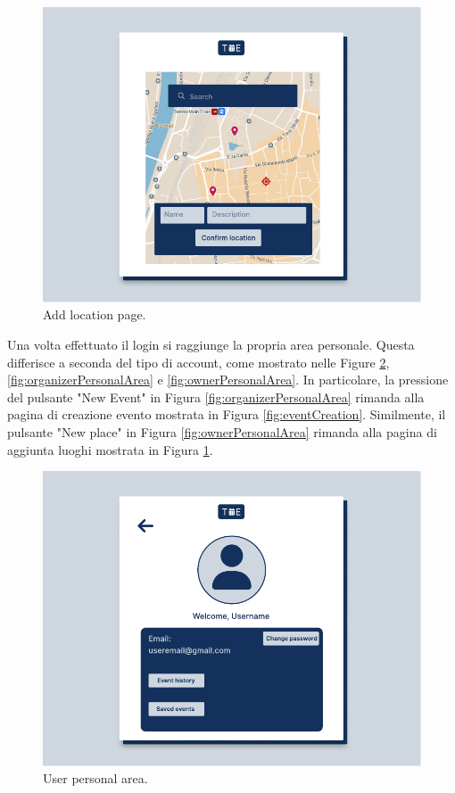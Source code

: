 \documentclass[9pt]{extarticle}
\begin{document}
\begin{figure}[!htb]
	\centering
	\includegraphics[width=.7\linewidth]{./images/AddLocation.pdf}
	\caption{Add location page.}
	\label{fig:addLocation}
\end{figure}


Una volta effettuato il login si raggiunge la propria area personale. Questa differisce a seconda del tipo di account, come mostrato nelle Figure \ref{fig:userPersonalArea}, \ref{fig:organizerPersonalArea} e \ref{fig:ownerPersonalArea}. In particolare, la pressione del pulsante "New Event" in Figura \ref{fig:organizerPersonalArea} rimanda alla pagina di creazione evento mostrata in Figura \ref{fig:eventCreation}. Similmente, il pulsante "New place" in Figura \ref{fig:ownerPersonalArea} rimanda alla pagina di aggiunta luoghi mostrata in Figura \ref{fig:addLocation}.


\begin{figure}[!htb]
	\centering
	\includegraphics[width=.7\linewidth]{./images/UserPersonalArea.pdf}
	\caption{User personal area.}
	\label{fig:userPersonalArea}
\end{figure}
\end{document}
